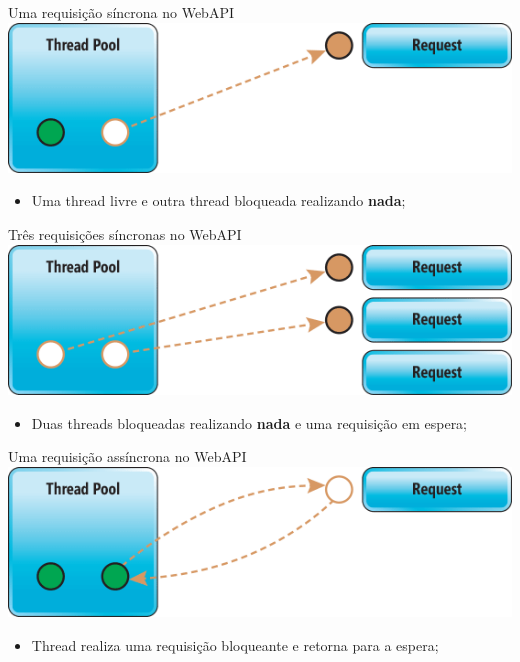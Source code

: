 \documentclass[10pt]{beamer}
\begin{document}
\begin{frame}{Uma requisição síncrona no WebAPI}
	\includegraphics[width=\textwidth]{imgs/sync1}
	\vspace{0.5cm}
	
	\begin{itemize}
		\item Uma thread livre e outra thread bloqueada realizando \textbf{nada};
	\end{itemize}
\end{frame}

\begin{frame}{Três requisições síncronas no WebAPI}
	\includegraphics[width=\textwidth]{imgs/sync2}
	\vspace{0.5cm}
	
	\begin{itemize}
		\item Duas threads bloqueadas realizando \textbf{nada} e uma requisição em espera;
	\end{itemize}
\end{frame}

\begin{frame}{Uma requisição assíncrona no WebAPI}
	\includegraphics[width=\textwidth]{imgs/async}
	\vspace{0.5cm}
	
	\begin{itemize}
		\item Thread realiza uma requisição bloqueante e retorna para a espera;
	\end{itemize}
\end{frame}
\end{document}
